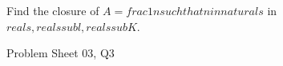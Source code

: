 \begin{samepage}
\begin{ex}
Find the closure of $A = {{ frac{1}{n} such that n in naturals }}$ in $reals, reals sub l, reals sub K$.
\end{ex}
\begin{source}
Problem Sheet 03, Q3
\end{source}
\end{samepage}
